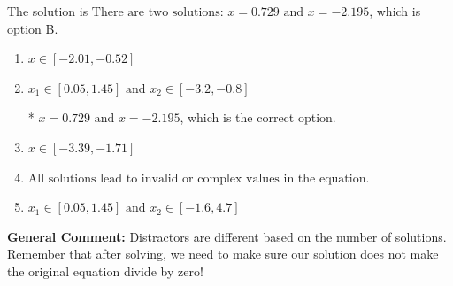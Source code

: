 \documentclass{extbook}[14pt]
\begin{document}
\begin{enumerate}
{The solution is \( \text{There are two solutions: } x = 0.729 \text{ and } x = -2.195 \), which is option B.\begin{enumerate}[label=\Alph*.]
\item \( x \in [-2.01,-0.52] \)


\item \( x_1 \in [0.05, 1.45] \text{ and } x_2 \in [-3.2,-0.8] \)

* $x = 0.729 \text{ and } x = -2.195$, which is the correct option.
\item \( x \in [-3.39,-1.71] \)


\item \( \text{All solutions lead to invalid or complex values in the equation.} \)


\item \( x_1 \in [0.05, 1.45] \text{ and } x_2 \in [-1.6,4.7] \)


\end{enumerate}

\textbf{General Comment:} Distractors are different based on the number of solutions. Remember that after solving, we need to make sure our solution does not make the original equation divide by zero!
}
\end{enumerate}
\end{document}
